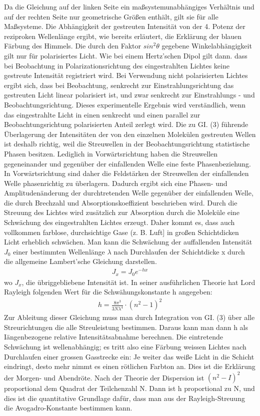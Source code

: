 Da die Gleichung auf der linken Seite ein maßsystemunabhängiges Verhältnis und auf der rechten Seite nur geometrische Größen enthält, gilt sie für alle Maßsysteme.
Die Abhängigkeit der gestreuten Intensität von der 4. Potenz der reziproken Wellenlänge ergibt, wie bereits erläutert, die Erklärung der blauen Färbung des Himmels.
Die durch den Faktor $sin^2\theta$ gegebene Winkelabhängigkeit gilt nur für polarisiertes Licht. Wie bei einem Hertz’schen Dipol gilt dann. dass bei Beobachtung in Polarizationsrichtung des eingestrahlten Lichtes keine gestreute Intensität registriert wird. Bei Verwendung nicht polarisierten Lichtes ergibt sich, dass bei Beobachtung, senkrecht zur Einstrahlungsrichtung das gestreuten Licht linear polarisiert ist, und zwar senkrecht zur Einstrahlungs - und Beobachtungsrichtung. Dieses experimentelle Ergebnis wird verständlich, wenn das eingestrahlte Licht in einen senkrecht und einen parallel zur Beobachtungsrichtung polarisierten Anteil zerlegt wird.
Die zu GI. (3) führende Überlagerung der Intensitäten der von den einzelnen Molekülen gestreuten Wellen ist deshalb richtig, weil die Streuwellen in der Beobachtungsrichtung statistische Phasen besitzen. Lediglich in Vorwärtsrichtung haben die Streuwellen gegeneinander und gegenüber der einfallenden Welle eine feste Phasenbeziehung. In Vorwärtsrichtung sind daher die Feldstärken der Streuwellen der einfallenden Welle phasenrichtig zu überlagern. Dadurch ergibt sich eine Phasen- und Amplitudenänderung der durchtretenden Welle gegenüber der einfallenden Welle, die durch Brechzahl und Absorptionskoeffizient beschrieben wird.
Durch die Streuung des Lichtes wird zusätzlich zur Absorption durch die Moleküle eine Schwächung des eingestrahlten Lichtes erzeugt. Daher kommt es, dass auch vollkommen farblose, durchsichtige Gase (z. B. Luft] in großen Schichtdicken Licht erheblich schwächen. Man kann die Schwächung der auffallenden Intensität $J_0$ einer bestimmten Wellenlänge $\lambda$ nach Durchlaufen der Schichtdicke x durch die allgemeine Lambert'sche Gleichung darstellen.
\begin{align}
J_x = J_0 e^{-hx}
\end{align}
wo $J_x$, die übriggebliebene Intensität ist. In seiner ausführlichen Theorie hat Lord Rayleigh folgenden Wert für die Schwähungskonstante h angegeben:
\begin{align}
h = \frac{8\pi^3}{3N\lambda^4}\cdot(n^2-1)^2
\end{align}
Zur Ableitung dieser Gleichung muss man durch Integration von GI. (3) über alle Streurichtungen die alle Streuleistung bestimmen. Daraus kann man dann h als Iängenbezogene relative Intensitätsabnahme berechnen.
Die eintretende Schwächung ist wellenabhängig; es tritt also eine Färbung weissen Lichtes nach Durchlaufen einer grossen Gasstrecke ein: Je weiter das weiße Licht in die Schicht eindringt, desto mehr nimmt es einen rötlichen Farbton an.
Dies ist die Erklärung der Morgen- und Abendröte.
Nach der Theorie der Dispersion ist $(n^2 - I )^2$ proportional dem Quadrat der Teilchenzahl N. Dann ist h proportional zu N, und dies ist die quantitative Grundlage dafür, dass man aus der Rayleigh-Streuung die Avogadro-Konstante bestimmen kann.
